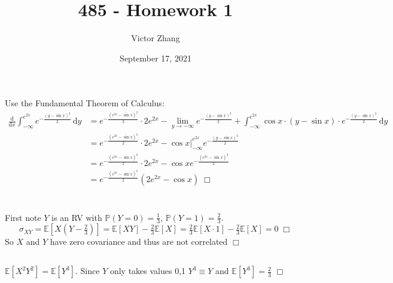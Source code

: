 \documentclass{article}
\title{485 - Homework 1}
\author{Victor Zhang}
\date{September 17, 2021}
\begin{document}
\maketitle

\section{}
Use the Fundamental Theorem of Calculus:
\begin{equation*}
\begin{split}
\frac{\mathrm{d}}{\mathrm{d}x} \int_{-\infty}^{e^{2x}} e^{-\frac{(y-\sin x)^2}{2}} \,\mathrm{d}y
&= e^{-\frac{(e^{2x}-\sin x)^2}{2}} \cdot 2e^{2x} - \lim\limits_{y \to -\infty} e^{-\frac{(y-\sin x)^2}{2}} + \int_{-\infty}^{e^{2x}} \cos x \cdot (y-\sin x) \cdot e^{-\frac{(y-\sin x)^2}{2}} \,\mathrm{d}y\\
&= e^{-\frac{(e^{2x}-\sin x)^2}{2}} \cdot 2e^{2x} - \cos x \big\vert_{-\infty}^{e^{2x}} e^{-\frac{(y - \sin x)^2}{2}}\\
&= e^{-\frac{(e^{2x}-\sin x)^2}{2}} \cdot 2e^{2x} - \cos x e^{-\frac{(e^{2x}-\sin x)^2}{2}}\\
&= e^{-\frac{(e^{2x}-\sin x)^2}{2}}\left(2e^{2x} - \cos x\right) \; \Box
\end{split}
\end{equation*}

\section{}
\subsection{}
First note $Y$ is an RV with $\mathbb{P}(Y = 0) = \tfrac{1}{3}$, $\mathbb{P}(Y = 1) = \tfrac{2}{3}$.
$$\sigma_{XY} = \mathbb{E}[X(Y-\tfrac{2}{3})] = \mathbb{E}[XY] - \tfrac{2}{3}\mathbb{E}[X] = \tfrac{2}{3}\mathbb{E}[X \cdot 1] - \tfrac{2}{3} \mathbb{E}[X] = 0 \; \Box$$
So $X$ and $Y$ have zero covariance and thus are not correlated $\Box$

\subsection{}
$\mathbb{E}[X^2Y^2] = \mathbb{E}[Y^3]$. Since $Y$ only takes values 0,1 $Y^3 \equiv Y$ and $\mathbb{E}[Y^3] = \tfrac{2}{3}$ $\Box$
\end{document}
